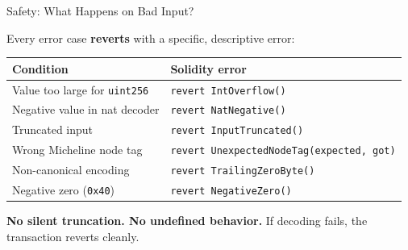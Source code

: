 \documentclass[aspectratio=169,10pt]{beamer}
\begin{document}
\begin{frame}{Safety: What Happens on Bad Input?}

Every error case \textbf{reverts} with a specific, descriptive error:

\bigskip

\begin{center}
\begin{tabular}{@{}ll@{}}
\toprule
\textbf{Condition} & \textbf{Solidity error} \\
\midrule
Value too large for \texttt{uint256} & \texttt{revert IntOverflow()} \\
Negative value in nat decoder       & \texttt{revert NatNegative()} \\
Truncated input                     & \texttt{revert InputTruncated()} \\
Wrong Micheline node tag             & \texttt{revert UnexpectedNodeTag(expected, got)} \\
Non-canonical encoding              & \texttt{revert TrailingZeroByte()} \\
Negative zero (\texttt{0x40})       & \texttt{revert NegativeZero()} \\
\bottomrule
\end{tabular}
\end{center}

\bigskip
\textbf{No silent truncation. No undefined behavior.} If decoding fails, the transaction reverts cleanly.
\end{frame}
\end{document}

